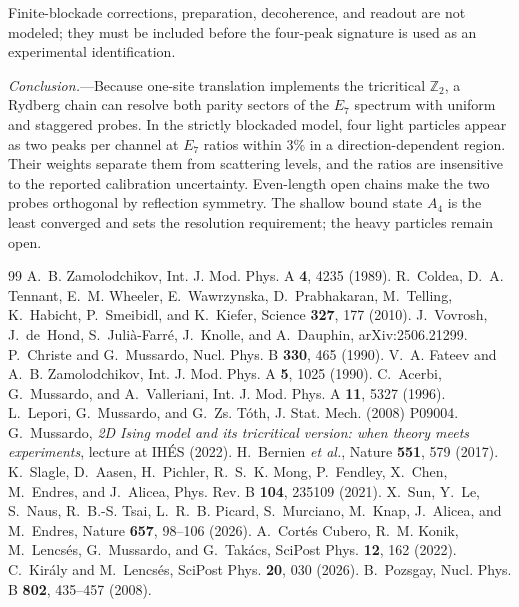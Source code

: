 \documentclass[aps,prl,twocolumn,superscriptaddress,showpacs,floatfix,10pt]{revtex4-2}
\begin{document}
Finite-blockade corrections, preparation, decoherence, and readout are not
modeled; they must be included before the four-peak signature is used as an
experimental identification.

\emph{Conclusion.}---Because one-site translation implements the tricritical
$\mathbb Z_2$, a Rydberg chain can resolve both parity sectors of the $E_7$
spectrum with uniform and staggered probes. In the strictly blockaded model, four
light particles appear as two peaks per channel at $E_7$ ratios within $3\%$ in a
direction-dependent region. Their weights separate them from scattering levels,
and the ratios are insensitive to the reported calibration uncertainty. Even-length
open chains make the two probes orthogonal by reflection symmetry. The shallow bound
state $A_4$ is the least converged and sets the resolution requirement; the heavy
particles remain open.

\begin{acknowledgments}
[Acknowledgments.]
\end{acknowledgments}

\begin{thebibliography}{99}
A.~B. Zamolodchikov, Int. J. Mod. Phys. A \textbf{4}, 4235 (1989).
R.~Coldea, D.~A. Tennant, E.~M. Wheeler, E.~Wawrzynska, D.~Prabhakaran,
M.~Telling, K.~Habicht, P.~Smeibidl, and K.~Kiefer, Science \textbf{327}, 177 (2010).
J.~Vovrosh, J.~de~Hond, S.~Juli\`a-Farr\'e, J.~Knolle, and A.~Dauphin,
arXiv:2506.21299.
P.~Christe and G.~Mussardo, Nucl. Phys. B \textbf{330}, 465 (1990).
V.~A. Fateev and A.~B. Zamolodchikov, Int. J. Mod. Phys. A \textbf{5}, 1025 (1990).
C.~Acerbi, G.~Mussardo, and A.~Valleriani, Int. J. Mod. Phys. A \textbf{11}, 5327
(1996).
L.~Lepori, G.~Mussardo, and G.~Zs. T\'oth, J. Stat. Mech. (2008) P09004.
G.~Mussardo, \emph{2D Ising model and its tricritical version: when theory meets
experiments}, lecture at IH\'ES (2022).
H.~Bernien \emph{et al.}, Nature \textbf{551}, 579 (2017).
K.~Slagle, D.~Aasen, H.~Pichler, R.~S.~K. Mong, P.~Fendley, X.~Chen, M.~Endres,
and J.~Alicea, Phys. Rev. B \textbf{104}, 235109 (2021).
X.~Sun, Y.~Le, S.~Naus, R.~B.-S. Tsai, L.~R.~B. Picard, S.~Murciano, M.~Knap,
J.~Alicea, and M.~Endres, Nature \textbf{657}, 98--106 (2026).
A.~Cort\'es Cubero, R.~M. Konik, M.~Lencs\'es, G.~Mussardo, and G.~Tak\'acs,
SciPost Phys. \textbf{12}, 162 (2022).
C.~Kir\'aly and M.~Lencs\'es, SciPost Phys. \textbf{20}, 030 (2026).
B.~Pozsgay, Nucl. Phys. B \textbf{802}, 435--457 (2008).
\end{thebibliography}
\end{document}

